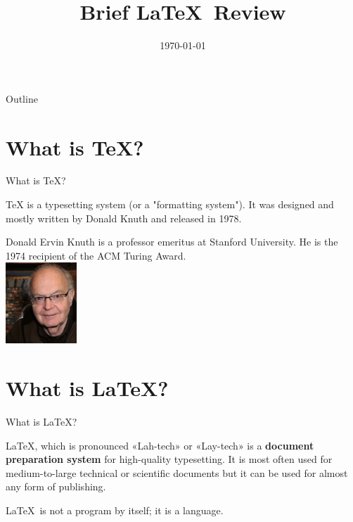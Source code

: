\documentclass{beamer}
\title{Brief \LaTeX \ Review}
\date{\today}
\begin{document}
\begin{frame}
	\titlepage
\end{frame}

\begin{frame}{Outline}
	\tableofcontents
\end{frame}

\section{What is \TeX?}
\begin{frame}{What is \TeX?}
\begin{definition}
	TeX is a typesetting system (or a "formatting system"). It was designed and mostly written by Donald Knuth and released in 1978.
\end{definition}
\footnotesize
Donald Ervin Knuth is a professor emeritus at Stanford University. He is the 1974 recipient of the ACM Turing Award.\\
\includegraphics[width=0.20\textwidth]{knuth.jpg}

\end{frame}

\section{What is \LaTeX?}
\begin{frame}{What is \LaTeX?}
\begin{definition}
	\LaTeX, which is pronounced «Lah-tech» or «Lay-tech»  is a \textbf{document preparation system} for high-quality typesetting. It is most often used for medium-to-large technical or scientific documents but it can be used for almost any form of publishing.
\end{definition}
	\LaTeX\ is not a program by itself; it is a language.
\end{frame}
\end{document}
